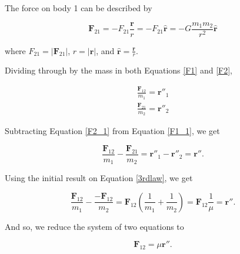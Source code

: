 \begin{frame}{\subsecname}

The force on body 1 can be described by

\begin{equation}
\mathbf{F}_{21} = -F_{21}\frac{\mathbf{r}}{r} =  -F_{21}\hat{\mathbf{r}} = -G\frac{m_1m_2}{r^2} \hat{\mathbf{r}}
\end{equation}

where \(F_{21} = |\mathbf{F}_{21}|\), \(r = |\mathbf{r}|\), and \(\hat{\mathbf{r}} = \frac{\mathbf{r}}{r}\).

\end{frame}

\begin{frame}{\subsecname}

Dividing through by the mass in both Equations \ref{F1} and \ref{F2},

\begin{align}
\frac{\mathbf{F}_{12}}{m_1} = \mathbf{r}''_1 \label{F1_1}\\ 
\frac{\mathbf{F}_{21}}{m_2} = \mathbf{r}''_2 \label{F2_1} 
\end{align}

\end{frame}

\begin{frame}{\subsecname}

Subtracting Equation \ref{F2_1} from Equation \ref{F1_1}, we get

\begin{equation}
\frac{\mathbf{F}_{12}}{m_1} - \frac{\mathbf{F}_{21}}{m_2} = \mathbf{r}''_1 - \mathbf{r}''_2 = \mathbf{r}''.
\end{equation}

Using the initial result on Equation \ref{3rdlaw}, we get

\begin{equation}
\frac{\mathbf{F}_{12}}{m_1} - \frac{-\mathbf{F}_{12}}{m_2} = \mathbf{F}_{12}\left(\frac{1}{m_1} + \frac{1}{m_2} \right) = \mathbf{F}_{12} \frac{1}{\mu} = \mathbf{r}''.
\end{equation}

\end{frame}

\begin{frame}{\subsecname}
And so, we reduce the system of two equations to

\begin{equation}
\mathbf{F}_{12} = \mu\mathbf{r}''.
\end{equation}

\end{frame}

